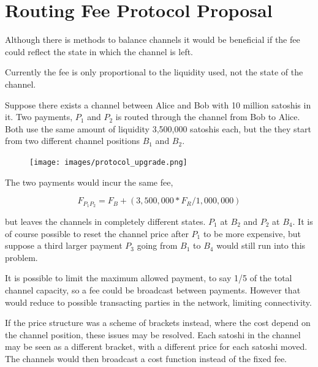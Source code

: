 \chapter{Routing Fee Protocol Proposal}

Although there is methods to balance channels it would be beneficial if the fee could reflect the state in which the channel is left.

Currently the fee is only proportional to the liquidity used, not the state of the channel.

Suppose there exists a channel between Alice and Bob with 10 million satoshis in it. 
Two payments, $P_{1}$ and $P_{2}$ is routed through the channel from Bob to Alice.
Both use the same amount of liquidity 3,500,000 satoshis each, but the they start from
two different channel positions $B_{1}$ and $B_2$.

\begin{figure}[!htb]
	\hspace*{-0.7cm} 
	\centering
	\texttt{[image: images/protocol\_upgrade.png]}

	\label{fig:xt_nodes}
	\hspace*{2mm} 	
\end{figure}

The two payments would incur the same fee, 

\[ F_{P_1 P_2} = F_B + (3,500,000 * F_R / 1,000,000) \]

but leaves the channels in completely different states. $P_1$ at $B_2$ and $P_2$ at $B_4$. It is of course possible to reset the channel price after $P_1$ to
be more expensive, but suppose a third larger payment $P_3$ going from $B_1$ to $B_4$ would still run into this problem.

It is possible to limit the maximum allowed payment, to say 1/5 of the total channel capacity, so a fee could be broadcast between payments. However 
that would reduce to possible transacting parties in the network, limiting connectivity.

If the price structure was a scheme of brackets instead, where the cost depend on the channel position, these issues may be resolved. 
Each satoshi in the channel may be seen as a different bracket, with a different price for each satoshi moved. The channels would then broadcast a cost function instead of the fixed fee.

